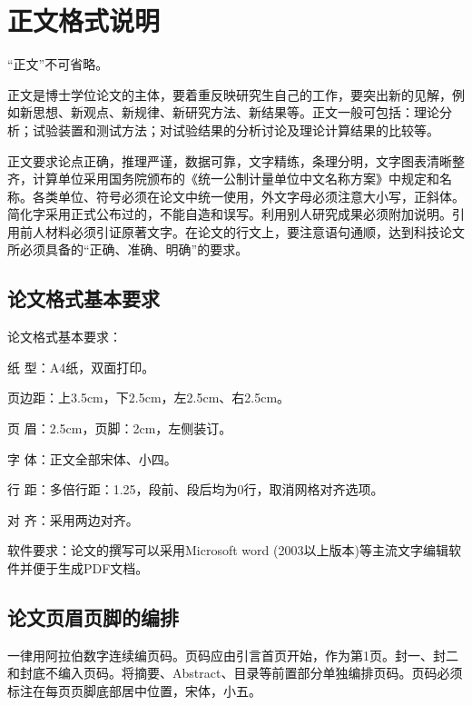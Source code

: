\chapter{正文格式说明}
%
\label{cha:format}
“正文”不可省略。

正文是博士学位论文的主体，要着重反映研究生自己的工作，要突出新的见解，例如新思想、新观点、新规律、新研究方法、新结果等。正文一般可包括：理论分析；试验装置和测试方法；对试验结果的分析讨论及理论计算结果的比较等。

正文要求论点正确，推理严谨，数据可靠，文字精练，条理分明，文字图表清晰整齐，计算单位采用国务院颁布的《统一公制计量单位中文名称方案》中规定和名称。各类单位、符号必须在论文中统一使用，外文字母必须注意大小写，正斜体。简化字采用正式公布过的，不能自造和误写。利用别人研究成果必须附加说明。引用前人材料必须引证原著文字。在论文的行文上，要注意语句通顺，达到科技论文所必须具备的“正确、准确、明确”的要求。

\section{论文格式基本要求}
论文格式基本要求：
\begin{asparaenum}[(1)]
    \item  纸  型：A4纸，双面打印。

    \item 页边距：上3.5cm，下2.5cm，左2.5cm、右2.5cm。

    \item 页  眉：2.5cm，页脚：2cm，左侧装订。

    \item 字  体：正文全部宋体、小四。

    \item 行  距：多倍行距：1.25，段前、段后均为0行，取消网格对齐选项。

    \item 对  齐：采用两边对齐。

    \item 软件要求：论文的撰写可以采用Microsoft word (2003以上版本)等主流文字编辑软件并便于生成PDF文档。
\end{asparaenum}
\section{论文页眉页脚的编排}
一律用阿拉伯数字连续编页码。页码应由引言首页开始，作为第1页。封一、封二和封底不编入页码。将摘要、Abstract、目录等前置部分单独编排页码。页码必须标注在每页页脚底部居中位置，宋体，小五。

